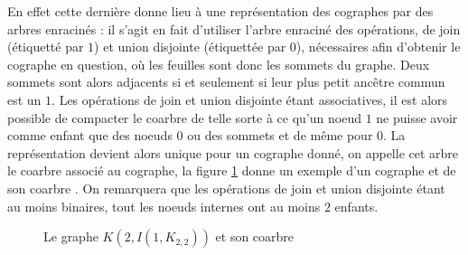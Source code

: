 \documentclass{scrartcl}
\begin{document}
\begin{flushleft}
En effet cette dernière donne lieu à une représentation des cographes par des arbres enracinés : il s'agit en fait d'utiliser l'arbre
enraciné des opérations, de join (étiquetté par $1$) et union disjointe (étiquettée par $0$), nécessaires afin d'obtenir le cographe en question,
où les feuilles sont donc les sommets du graphe. Deux sommets sont alors adjacents si et seulement si leur plus petit ancêtre commun est un $1$.
Les opérations de join et union disjointe étant associatives, il est alors possible de compacter le coarbre de telle sorte à ce qu'un noeud
$1$ ne puisse avoir comme enfant que des noeuds $0$ ou des sommets et de même pour $0$. La représentation devient alors unique pour un cographe
donné, on appelle cet arbre le coarbre associé au cographe, la figure \ref{excographe} donne un exemple d'un cographe et de son coarbre \cite{cotrees}.
On remarquera que les opérations de join et union disjointe étant au moins binaires, tout les noeuds internes ont au moins $2$ enfants. 

\begin{figure}[h]
    \caption{Le graphe $K(2,I(1,K_{2,2}))$ et son coarbre}\label{excographe}
    \vspace*{0.5cm}
    \begin{center}
\end{center}
\end{figure}
\end{flushleft}
\end{document}
